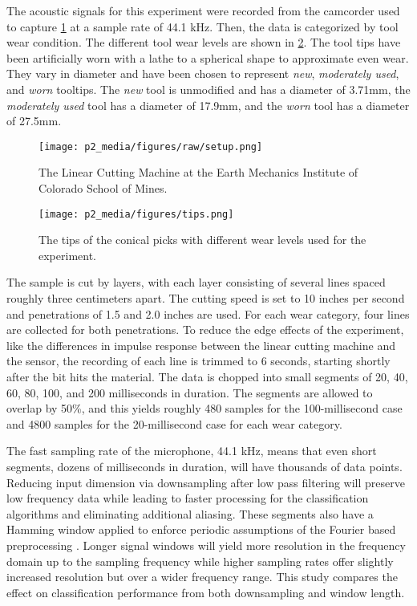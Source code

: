 The acoustic signals for this experiment were recorded from the camcorder 
used to capture \ref{fig:setup} at a sample rate of 44.1 kHz.
Then, the data is categorized by tool wear condition.
The different tool wear levels are shown in \ref{fig:levels}.
The tool tips have been artificially worn with a lathe to a spherical shape to approximate even wear.
They vary in diameter and have been chosen to represent 
\textit{new}, \textit{moderately used}, and \textit{worn} tooltips.
The \textit{new} tool is unmodified and has a diameter of 3.71mm, 
the \textit{moderately used} tool has a diameter of 17.9mm,
 and the \textit{worn} tool has a diameter of 27.5mm.

\begin{figure}[t!]
\centering
\texttt{[image: p2\_media/figures/raw/setup.png]}
\caption{The Linear Cutting Machine at the Earth Mechanics Institute of Colorado School of Mines.
}
\label{fig:setup}
\end{figure}

\begin{figure}[t!]
\centering
\texttt{[image: p2\_media/figures/tips.png]}
\caption{The tips of the conical picks with different wear levels used for the experiment.
}
\label{fig:levels}
\end{figure}

The sample is cut by layers, with each layer consisting of several lines spaced roughly three centimeters apart. 
The cutting speed is set to 10 inches per second and penetrations of 1.5 and 2.0 inches are used. 
For each wear category, four lines are collected for both penetrations. 
To reduce the edge effects of the experiment, like the differences in impulse response between 
the linear cutting machine and the sensor, the recording of each line is trimmed to 6 seconds, 
starting shortly after the bit hits the material. The data is chopped into small segments of 
20, 40, 60, 80, 100, and 200 milliseconds in duration. The segments are allowed to overlap by 50\%, 
and this yields roughly 480 samples for the 100-millisecond case and 4800 samples for the 
20-millisecond case for each wear category.

The fast sampling rate of the microphone, 44.1 kHz, means that even short segments,
dozens of milliseconds in duration, will have thousands of data points.
Reducing input dimension via downsampling after low pass filtering will preserve 
low frequency data while leading to faster processing for the classification algorithms and 
eliminating additional aliasing.
These segments also have a Hamming window applied 
to enforce periodic assumptions of the Fourier based preprocessing \cite{prabhu2014window}.
Longer signal windows will yield more resolution in the frequency domain up to the sampling frequency
while higher sampling rates offer slightly increased resolution but over a wider frequency range.
This study compares the effect on classification performance from both downsampling and window length.

